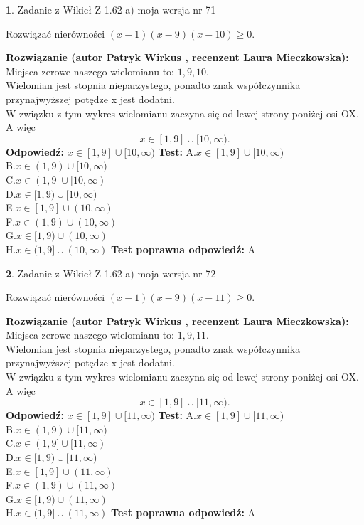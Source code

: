 \documentclass[12pt, a4paper]{article}
\theoremstyle{definition} %
\newtheorem{zad}{}
\newcommand{\zadStart}[1]{\begin{zad}#1\newline}
\newcommand{\zadStop}{\end{zad}}
\newcommand{\rozwStart}[2]{\noindent \textbf{Rozwiązanie (autor #1 , recenzent #2): }\newline}
\newcommand{\rozwStop}{\newline}
\newcommand{\odpStart}{\noindent \textbf{Odpowiedź:}\newline}
\newcommand{\odpStop}{\newline}
\newcommand{\testStart}{\noindent \textbf{Test:}\newline}
\newcommand{\testStop}{\newline}
\newcommand{\kluczStart}{\noindent \textbf{Test poprawna odpowiedź:}\newline}
\newcommand{\kluczStop}{\newline}
\begin{document}
\zadStart{Zadanie z Wikieł Z 1.62 a) moja wersja nr 71}

Rozwiązać nierówności $(x-1)(x-9)(x-10)\ge0$.
\zadStop
\rozwStart{Patryk Wirkus}{Laura Mieczkowska}
Miejsca zerowe naszego wielomianu to: $1, 9, 10$.\\
Wielomian jest stopnia nieparzystego, ponadto znak współczynnika przy\linebreak najwyższej potędze x jest dodatni.\\ W związku z tym wykres wielomianu zaczyna się od lewej strony poniżej osi OX. A więc $$x \in [1,9] \cup [10,\infty).$$
\rozwStop
\odpStart
$x \in [1,9] \cup [10,\infty)$
\odpStop
\testStart
A.$x \in [1,9] \cup [10,\infty)$\\
B.$x \in (1,9) \cup [10,\infty)$\\
C.$x \in (1,9] \cup [10,\infty)$\\
D.$x \in [1,9) \cup [10,\infty)$\\
E.$x \in [1,9] \cup (10,\infty)$\\
F.$x \in (1,9) \cup (10,\infty)$\\
G.$x \in [1,9) \cup (10,\infty)$\\
H.$x \in (1,9] \cup (10,\infty)$
\testStop
\kluczStart
A
\kluczStop



\zadStart{Zadanie z Wikieł Z 1.62 a) moja wersja nr 72}

Rozwiązać nierówności $(x-1)(x-9)(x-11)\ge0$.
\zadStop
\rozwStart{Patryk Wirkus}{Laura Mieczkowska}
Miejsca zerowe naszego wielomianu to: $1, 9, 11$.\\
Wielomian jest stopnia nieparzystego, ponadto znak współczynnika przy\linebreak najwyższej potędze x jest dodatni.\\ W związku z tym wykres wielomianu zaczyna się od lewej strony poniżej osi OX. A więc $$x \in [1,9] \cup [11,\infty).$$
\rozwStop
\odpStart
$x \in [1,9] \cup [11,\infty)$
\odpStop
\testStart
A.$x \in [1,9] \cup [11,\infty)$\\
B.$x \in (1,9) \cup [11,\infty)$\\
C.$x \in (1,9] \cup [11,\infty)$\\
D.$x \in [1,9) \cup [11,\infty)$\\
E.$x \in [1,9] \cup (11,\infty)$\\
F.$x \in (1,9) \cup (11,\infty)$\\
G.$x \in [1,9) \cup (11,\infty)$\\
H.$x \in (1,9] \cup (11,\infty)$
\testStop
\kluczStart
A
\kluczStop
\end{document}
